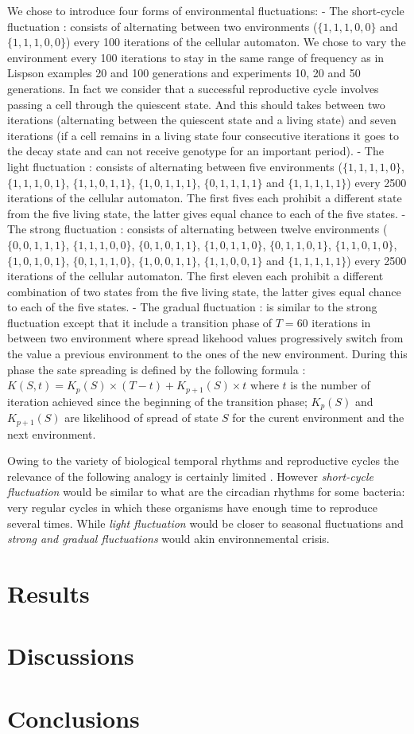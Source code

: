 \documentclass{sig-alternate-05-2015}
\begin{document}
We chose to introduce four forms of environmental fluctuations:
- The short-cycle fluctuation : consists of alternating between two environments ($\{1,1,1,0,0\}$ and $\{1,1,1,0,0\}$) every 100 iterations of the cellular automaton. We chose to vary the environment every 100 iterations to stay in the same range of frequency as in Lispson \cite{lipson2002origin} examples 20 and 100 generations and \cite{yu2007program} experiments 10, 20 and 50 generations. In fact we consider that a successful reproductive cycle involves passing a cell through the quiescent state. And this should takes between two iterations (alternating between the quiescent state and a living state) and seven iterations  (if a cell remains in a living state four consecutive iterations it goes to the decay state and can not receive genotype for an important period).
- The light fluctuation : consists of alternating between five environments ($\{1,1,1,1,0\}$, $\{1,1,1,0,1\}$, $\{1,1,0,1,1\}$, $\{1,0,1,1,1\}$, $\{0,1,1,1,1\}$ and $\{1,1,1,1,1\}$) every 2500 iterations of the cellular automaton. The first fives each prohibit a different state from the five living state, the latter gives equal chance to each of the five states.
- The strong fluctuation : consists of alternating between twelve environments ($\{0,0,1,1,1\}$, $\{1,1,1,0,0\}$, $\{0,1,0,1,1\}$, $\{1,0,1,1,0\}$, $\{0,1,1,0,1\}$, $\{1,1,0,1,0\}$, $\{1,0,1,0,1\}$, $\{0,1,1,1,0\}$, $\{1,0,0,1,1\}$, $\{1,1,0,0,1\}$ and $\{1,1,1,1,1\}$) every 2500 iterations of the cellular automaton. The first eleven each prohibit a different combination of two states from the five living state, the latter gives equal chance to each of the five states.
- The gradual fluctuation : is similar to the strong fluctuation except that it include a transition phase of $T=60$ iterations in between two environment where spread likehood values progressively switch from the value a previous environment to the ones of the new environment. During this phase the sate spreading is defined by the following formula : $K(S,t)=K_p(S) \times (T-t) + K_{p+1}(S) \times t$ where $t$ is the number of iteration achieved since the beginning of the transition phase; $K_p(S)$ and $K_{p+1}(S)$ are likelihood of spread of state $S$ for the curent environment and the next environment. 

Owing to the variety of biological temporal rhythms and reproductive cycles the relevance of the following analogy is certainly limited . However \emph{short-cycle fluctuation} would be similar to what are the circadian rhythms for some bacteria: very regular cycles in which these organisms have enough time to reproduce several times. While \emph{light fluctuation} would be closer to seasonal fluctuations and \emph{strong and gradual fluctuations} would akin environnemental crisis. 
\section{Results}

\section{Discussions}


\section{Conclusions}
{}



\end{document}
